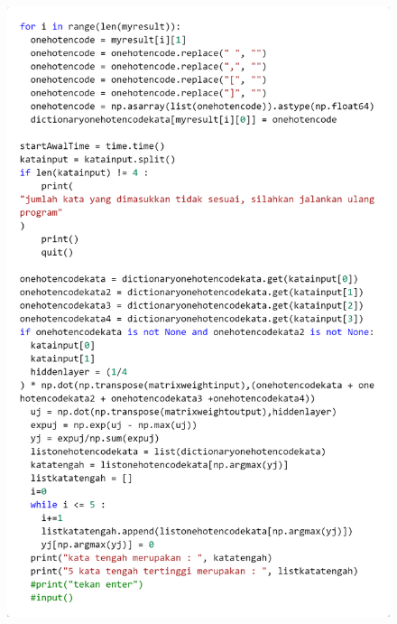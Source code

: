\documentclass[12pt]{report}
\begin{document}
\begin{figure}[H]
\centering
\includegraphics[scale=0.3]{search4cbow2}
\end{figure}
\end{document}
